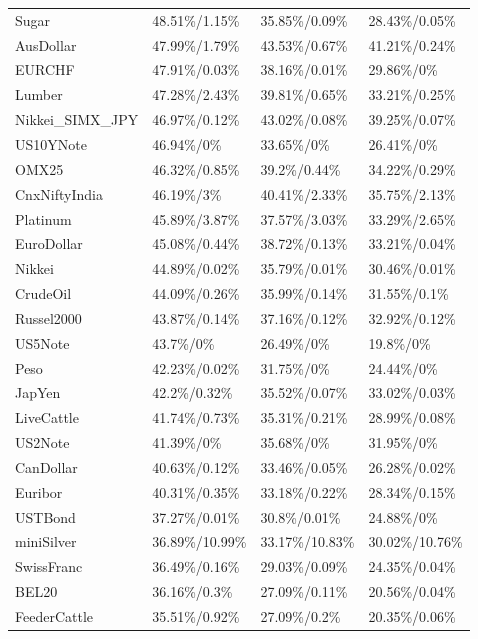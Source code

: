 \documentclass[a4paper,12pt,openany, DIV=calc, headsepline]{scrbook}
\begin{document}
\begin{longtable}{llll}
  Sugar & 48.51\%/1.15\% & 35.85\%/0.09\% & 28.43\%/0.05\% \\ 
  AusDollar & 47.99\%/1.79\% & 43.53\%/0.67\% & 41.21\%/0.24\% \\ 
  EURCHF & 47.91\%/0.03\% & 38.16\%/0.01\% & 29.86\%/0\% \\ 
  Lumber & 47.28\%/2.43\% & 39.81\%/0.65\% & 33.21\%/0.25\% \\ 
  Nikkei\_SIMX\_JPY & 46.97\%/0.12\% & 43.02\%/0.08\% & 39.25\%/0.07\% \\ 
  US10YNote & 46.94\%/0\% & 33.65\%/0\% & 26.41\%/0\% \\ 
  OMX25 & 46.32\%/0.85\% & 39.2\%/0.44\% & 34.22\%/0.29\% \\ 
  CnxNiftyIndia & 46.19\%/3\% & 40.41\%/2.33\% & 35.75\%/2.13\% \\ 
  Platinum & 45.89\%/3.87\% & 37.57\%/3.03\% & 33.29\%/2.65\% \\ 
  EuroDollar & 45.08\%/0.44\% & 38.72\%/0.13\% & 33.21\%/0.04\% \\ 
  Nikkei & 44.89\%/0.02\% & 35.79\%/0.01\% & 30.46\%/0.01\% \\ 
  CrudeOil & 44.09\%/0.26\% & 35.99\%/0.14\% & 31.55\%/0.1\% \\ 
  Russel2000 & 43.87\%/0.14\% & 37.16\%/0.12\% & 32.92\%/0.12\% \\ 
  US5Note & 43.7\%/0\% & 26.49\%/0\% & 19.8\%/0\% \\ 
  Peso & 42.23\%/0.02\% & 31.75\%/0\% & 24.44\%/0\% \\ 
  JapYen & 42.2\%/0.32\% & 35.52\%/0.07\% & 33.02\%/0.03\% \\ 
  LiveCattle & 41.74\%/0.73\% & 35.31\%/0.21\% & 28.99\%/0.08\% \\ 
  US2Note & 41.39\%/0\% & 35.68\%/0\% & 31.95\%/0\% \\ 
  CanDollar & 40.63\%/0.12\% & 33.46\%/0.05\% & 26.28\%/0.02\% \\ 
  Euribor & 40.31\%/0.35\% & 33.18\%/0.22\% & 28.34\%/0.15\% \\ 
  USTBond & 37.27\%/0.01\% & 30.8\%/0.01\% & 24.88\%/0\% \\ 
  miniSilver & 36.89\%/10.99\% & 33.17\%/10.83\% & 30.02\%/10.76\% \\ 
  SwissFranc & 36.49\%/0.16\% & 29.03\%/0.09\% & 24.35\%/0.04\% \\ 
  BEL20 & 36.16\%/0.3\% & 27.09\%/0.11\% & 20.56\%/0.04\% \\ 
  FeederCattle & 35.51\%/0.92\% & 27.09\%/0.2\% & 20.35\%/0.06\% \\ 

\end{longtable}
\end{document}
